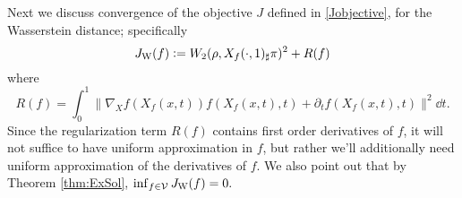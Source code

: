  
Next we discuss convergence of the objective $J$ defined in \eqref{Jobjective},
for the Wasserstein distance; specifically
  \begin{equation*}
    J_{\rm W}(f) := W_2(\rho,X_f(\cdot,1)_\sharp\pi)^2+R(f)
  \end{equation*}
  where
  \begin{equation}\label{eq:Rf}
    R(f) = \int_0^1\|\nabla_X f(X_f(x,t)) f(X_f(x,t),t)+\partial_t f(X_f(x,t),t)\|^2\dd t.
  \end{equation}
  Since the regularization term $R(f)$ contains first order
  derivatives of $f$, it will not suffice to have uniform
  approximation in $f$, but rather we'll additionally need uniform
  approximation of the derivatives of $f$.
We also point out that by Theorem \ref{thm:ExSol}, $\inf_{f\in\mathcal{V}}J_{\rm W}(f)=0.$
 
  


